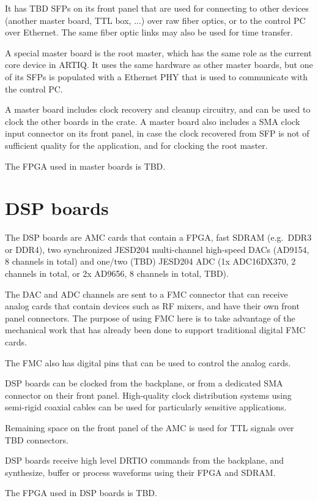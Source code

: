 \documentclass[11pt]{paper}
\begin{document}
It has TBD SFPs on its front panel that are used for connecting to other devices (another master board, TTL box, ...) over raw fiber optics, or to the control PC over Ethernet. The same fiber optic links may also be used for time transfer.

A special master board is the root master, which has the same role as the current core device in ARTIQ. It uses the same hardware as other master boards, but one of its SFPs is populated with a Ethernet PHY that is used to communicate with the control PC.

A master board includes clock recovery and cleanup circuitry, and can be used to clock the other boards in the crate. A master board also includes a SMA clock input connector on its front panel, in case the clock recovered from SFP is not of sufficient quality for the application, and for clocking the root master.

The FPGA used in master boards is TBD.

\section{DSP boards}
The DSP boards are AMC cards that contain a FPGA, fast SDRAM (e.g.\ DDR3 or DDR4), two synchronized JESD204 multi-channel high-speed DACs (AD9154, 8 channels in total) and one/two (TBD) JESD204 ADC (1x ADC16DX370, 2 channels in total, or 2x AD9656, 8 channels in total, TBD).

The DAC and ADC channels are sent to a FMC connector that can receive analog cards that contain devices such as RF mixers, and have their own front panel connectors. The purpose of using FMC here is to take advantage of the mechanical work that has already been done to support traditional digital FMC cards.

The FMC also has digital pins that can be used to control the analog cards.

DSP boards can be clocked from the backplane, or from a dedicated SMA connector on their front panel. High-quality clock distribution systems using semi-rigid coaxial cables can be used for particularly sensitive applications.

Remaining space on the front panel of the AMC is used for TTL signals over TBD connectors.

DSP boards receive high level DRTIO commands from the backplane, and synthesize, buffer or process waveforms using their FPGA and SDRAM.

The FPGA used in DSP boards is TBD.
\end{document}
